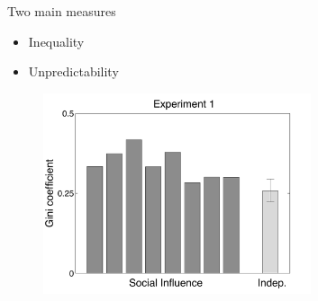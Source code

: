 \documentclass[aspectratio=169]{beamer}
\begin{document}
\begin{frame}

\setcounter{subfigure}{0}
\begin{figure}
  \centering
  \hspace{0in}
\end{figure}

\end{frame}
\begin{frame}

Two main measures
\begin{itemize}
\item Inequality
\item Unpredictability
\end{itemize}

\end{frame}
\begin{frame}

\begin{figure}
  \centering
  \includegraphics[width=0.7\textwidth]{figures/gini_v1_unordered_ci}
\end{figure}

\end{frame}
\end{document}
